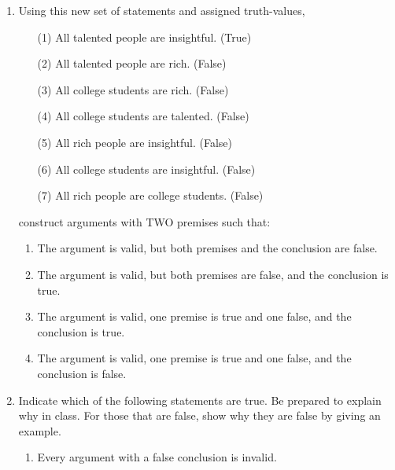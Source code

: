 \documentclass{article}
\begin{document}
\begin{enumerate}
 \break
 \item Using this new set of statements and assigned truth-values, 
 \begin{itemize}
 \item[(1)] All talented people are insightful. (True)
 \item[(2)] All talented people are rich. (False)
 \item[(3)] All college students are rich. (False) 
 \item[(4)] All college students are talented. (False)
 \item[(5)] All rich people are insightful. (False)
 \item[(6)] All college students are insightful. (False)
 \item[(7)] All rich people are college students. (False)
 
 \end{itemize}
 
 construct arguments with TWO premises such that:
 
 \begin{enumerate}
 \item The argument is valid, but both premises and the conclusion are false.
 
 \vspace{1.4 in}
 
 \item The argument is valid, but both premises are false, and the conclusion is true.
 
 \vspace{1.4 in}

 \item The argument is valid, one premise is true and one false, and the conclusion is true.
 
 \vspace{1.4 in}
 
  \item The argument is valid, one premise is true and one false, and the conclusion is false.
 
 \vspace{1 in}

 
 \end{enumerate}
 \break
 
 \item Indicate which of the following statements are true. Be prepared to explain why in class. For those that are false, show why they are false by giving an example.
 
 \begin{enumerate}
 \item Every argument with a false conclusion is invalid.
 \vspace{1.1 in}
 

\end{enumerate}
\end{enumerate}
\end{document}
